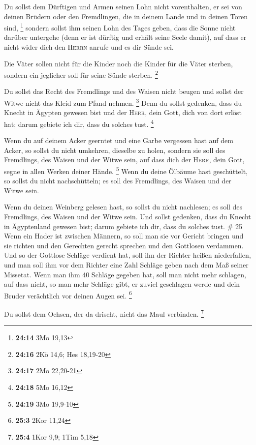  Du sollst dem Dürftigen und Armen seinen Lohn nicht
vorenthalten, er sei von deinen Brüdern oder den Fremdlingen, die in
deinem Lande und in deinen Toren sind, \footnote{\textbf{24:14} 3Mo
  19,13}  sondern sollst ihm seinen Lohn des Tages geben,
dass die Sonne nicht darüber untergehe (denn er ist dürftig und erhält
seine Seele damit), auf dass er nicht wider dich den \textsc{Herrn}
anrufe und es dir Sünde sei.

 Die Väter sollen nicht für die Kinder noch die Kinder
für die Väter sterben, sondern ein jeglicher soll für seine Sünde
sterben. \footnote{\textbf{24:16} 2Kö 14,6; Hes 18,19-20}

 Du sollst das Recht des Fremdlings und des Waisen nicht
beugen und sollst der Witwe nicht das Kleid zum Pfand nehmen.
\footnote{\textbf{24:17} 2Mo 22,20-21}  Denn du sollst
gedenken, dass du Knecht in Ägypten gewesen bist und der \textsc{Herr},
dein Gott, dich von dort erlöst hat; darum gebiete ich dir, dass du
solches tust. \footnote{\textbf{24:18} 5Mo 16,12}

 Wenn du auf deinem Acker geerntet und eine Garbe
vergessen hast auf dem Acker, so sollst du nicht umkehren, dieselbe zu
holen, sondern sie soll des Fremdlings, des Waisen und der Witwe sein,
auf dass dich der \textsc{Herr}, dein Gott, segne in allen Werken deiner
Hände. \footnote{\textbf{24:19} 3Mo 19,9-10}  Wenn du
deine Ölbäume hast geschüttelt, so sollst du nicht nachschütteln; es
soll des Fremdlings, des Waisen und der Witwe sein.

 Wenn du deinen Weinberg gelesen hast, so sollst du nicht
nachlesen; es soll des Fremdlings, des Waisen und der Witwe sein.
 Und sollst gedenken, dass du Knecht in Ägyptenland
gewesen bist; darum gebiete ich dir, dass du solches tust. \# 25
 Wenn ein Hader ist zwischen Männern, so soll man sie vor
Gericht bringen und sie richten und den Gerechten gerecht sprechen und
den Gottlosen verdammen.  Und so der Gottlose Schläge
verdient hat, soll ihn der Richter heißen niederfallen, und man soll ihm
vor dem Richter eine Zahl Schläge geben nach dem Maß seiner Missetat.
 Wenn man ihm 40 Schläge gegeben hat, soll man nicht mehr
schlagen, auf dass nicht, so man mehr Schläge gibt, er zuviel geschlagen
werde und dein Bruder verächtlich vor deinen Augen sei. \footnote{\textbf{25:3}
  2Kor 11,24}

 Du sollst dem Ochsen, der da drischt, nicht das Maul
verbinden. \footnote{\textbf{25:4} 1Kor 9,9; 1Tim 5,18}

